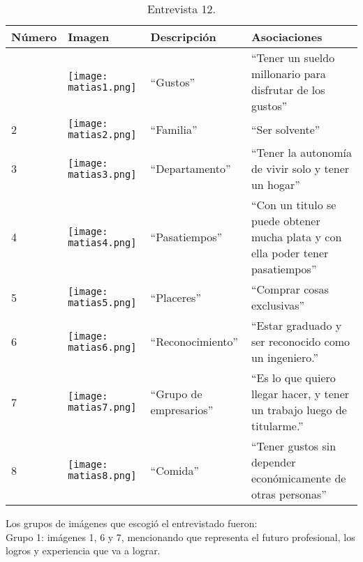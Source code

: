 \begin{table}[H]
\centering
\begin{tabular}{>{\centering\arraybackslash}m{1cm} >{\centering\arraybackslash}m{2cm} >{\arraybackslash}m{5cm}>{\arraybackslash}m{5cm}}
\hline
Número  & Imagen & Descripción & Asociaciones \\
\hline \hline

1 & \texttt{[image: matias1.png]} & ``Gustos'' & ``Tener un sueldo millonario para disfrutar de los gustos'' \\
\hline

2 & \texttt{[image: matias2.png]} & ``Familia'' & ``Ser solvente'' \\
\hline

3 & \texttt{[image: matias3.png]} & ``Departamento'' & ``Tener la autonomía de vivir solo y tener un hogar'' \\
\hline

4 & \texttt{[image: matias4.png]} & ``Pasatiempos'' & ``Con un titulo se puede obtener mucha plata y con ella poder tener pasatiempos'' \\
\hline

5 & \texttt{[image: matias5.png]} & ``Placeres'' & ``Comprar cosas exclusivas'' \\
\hline

6 & \texttt{[image: matias6.png]} & ``Reconocimiento'' & ``Estar graduado y ser reconocido como un ingeniero.'' \\
\hline

7 & \texttt{[image: matias7.png]} & ``Grupo de empresarios'' & ``Es lo que quiero llegar hacer, y tener un trabajo luego de titularme.'' \\
\hline

8 & \texttt{[image: matias8.png]} & ``Comida'' & ``Tener gustos sin depender económicamente de otras personas'' \\
\hline

\end{tabular}
\caption{Entrevista 12.}
\label{tabla:matias}
\end{table}

Los grupos de imágenes que escogió el entrevistado fueron:\\

Grupo 1: imágenes 1, 6 y 7, mencionando que representa el futuro profesional, los logros y experiencia que va a lograr.\\

